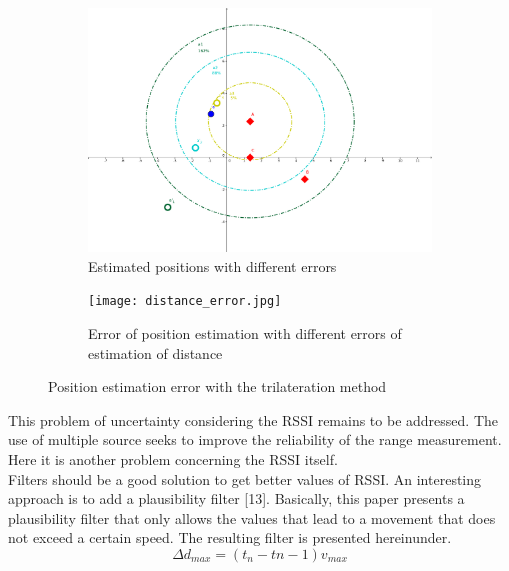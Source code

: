 \documentclass[a4paper,10pt]{article}
\begin{document}
\begin{figure}[H]
\centering
\begin{subfigure}{.5\textwidth}
  \centering
  \includegraphics[width=\linewidth]{trilateration_error.png}
  \caption{Estimated positions with different errors}
  \label{fig:sub3}
\end{subfigure}%
\begin{subfigure}{.5\textwidth}
  \centering
  \texttt{[image: distance\_error.jpg]}
  \caption{Error of position estimation with different errors of estimation of distance}
  \label{fig:sub4}
\end{subfigure}
\caption{Position estimation error with the trilateration method }
\label{fig:trilateration_errors}
\end{figure}
\noindent
This problem of uncertainty considering the RSSI remains to be addressed. The use of multiple source seeks to improve the reliability of the
range measurement. Here it is another problem concerning the RSSI itself.\\
Filters should be a good solution to get better values of RSSI. An interesting approach is to add a plausibility filter [13]. Basically, this
paper presents a plausibility filter that only allows the values that lead to a movement that does not exceed a certain speed. The resulting
filter is presented hereinunder.
$$
\Delta d_{max} = (t_n - t{n-1})v_{max} 
$$
\end{document}

